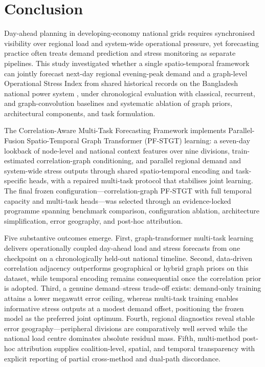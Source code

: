 \section{Conclusion}\label{sec:conclusion}

Day-ahead planning in developing-economy national grids requires synchronised visibility over regional load and system-wide operational pressure, yet forecasting practice often treats demand prediction and stress monitoring as separate pipelines. This study investigated whether a single spatio-temporal framework can jointly forecast next-day regional evening-peak demand and a graph-level Operational Stress Index from shared historical records on the Bangladesh national power system \cite{Hossain2025BangladeshSmartGrid}, under chronological evaluation with classical, recurrent, and graph-convolution baselines and systematic ablation of graph priors, architectural components, and task formulation.

The Correlation-Aware Multi-Task Forecasting Framework implements Parallel-Fusion Spatio-Temporal Graph Transformer (PF-STGT) learning: a seven-day lookback of node-level and national context features over nine divisions, train-estimated correlation-graph conditioning, and parallel regional demand and system-wide stress outputs through shared spatio-temporal encoding and task-specific heads, with a repaired multi-task protocol that stabilises joint learning. The final frozen configuration---correlation-graph PF-STGT with full temporal capacity and multi-task heads---was selected through an evidence-locked programme spanning benchmark comparison, configuration ablation, architecture simplification, error geography, and post-hoc attribution.

Five substantive outcomes emerge. First, graph-transformer multi-task learning delivers operationally coupled day-ahead load and stress forecasts from one checkpoint on a chronologically held-out national timeline. Second, data-driven correlation adjacency outperforms geographical or hybrid graph priors on this dataset, while temporal encoding remains consequential once the correlation prior is adopted. Third, a genuine demand--stress trade-off exists: demand-only training attains a lower megawatt error ceiling, whereas multi-task training enables informative stress outputs at a modest demand offset, positioning the frozen model as the preferred joint optimum. Fourth, regional diagnostics reveal stable error geography---peripheral divisions are comparatively well served while the national load centre dominates absolute residual mass. Fifth, multi-method post-hoc attribution supplies coalition-level, spatial, and temporal transparency with explicit reporting of partial cross-method and dual-path discordance.

